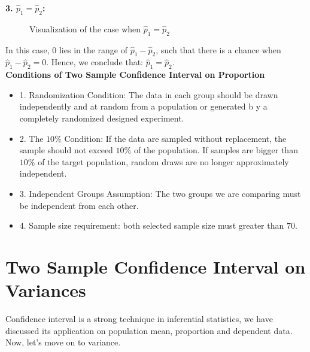 \textbf{3. $\hat{p}_1 = \hat{p}_2$:}

\begin{center}
\begin{figure}[h!]
\centering
{}
\caption{Visualization of the case when $\hat{p}_1 = \hat{p}_2$}
\end{figure}
\end{center}

In this case, $0$ lies in the range of $\hat{p}_1 - \hat{p}_2$, such that there is a chance when $\hat{p}_1 - \hat{p}_2 = 0$. Hence, we conclude that: $\hat{p}_1 = \hat{p}_2$.\\

\textbf{Conditions of Two Sample Confidence Interval on Proportion}

\begin{itemize}
	\item 1. Randomization Condition: The data in each group should be drawn independently and at random from a population or generated b y a completely randomized designed experiment.
	\item 2. The $10\%$ Condition: If the data are sampled without replacement, the sample should not exceed $10\%$ of the population. If samples are bigger than $10\%$ of the target population, random draws are no longer approximately independent.
	\item 3. Independent Groups Assumption: The two groups we are comparing must be independent from each other.
	\item 4. Sample size requirement: both selected sample size must greater than $70$.
\end{itemize}

\section{Two Sample Confidence Interval on Variances}

Confidence interval is a strong technique in inferential statistics, we have discussed its application on population mean, proportion and dependent data. Now, let's move on to variance.\\

